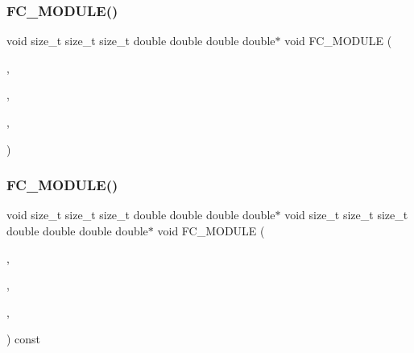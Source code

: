 \hypertarget{SimpleKernels_8H_aab57e6641df726e7d4d0795fdb8d2952}{}\label{SimpleKernels_8H_aab57e6641df726e7d4d0795fdb8d2952} 
\subsubsection{\texorpdfstring{F\+C\+\_\+\+M\+O\+D\+U\+L\+E()}{FC\_MODULE()}\hspace{0.1cm}{\footnotesize\ttfamily [17/26]}}
{\footnotesize\ttfamily void size\+\_\+t size\+\_\+t size\+\_\+t double double double double$\ast$ void F\+C\+\_\+\+M\+O\+D\+U\+LE (\begin{DoxyParamCaption}\item[{simple}]{,  }\item[{zwmxpy}]{,  }\item[{S\+I\+M\+P\+LE}]{,  }\item[{Z\+M\+W\+X\+PY}]{ }\end{DoxyParamCaption})}

\hypertarget{SimpleKernels_8H_a915edc4c95b0163b19b9ec4becea388c}{}\label{SimpleKernels_8H_a915edc4c95b0163b19b9ec4becea388c} 
\subsubsection{\texorpdfstring{F\+C\+\_\+\+M\+O\+D\+U\+L\+E()}{FC\_MODULE()}\hspace{0.1cm}{\footnotesize\ttfamily [18/26]}}
{\footnotesize\ttfamily void size\+\_\+t size\+\_\+t size\+\_\+t double double double double$\ast$ void size\+\_\+t size\+\_\+t size\+\_\+t double double double double$\ast$ void F\+C\+\_\+\+M\+O\+D\+U\+LE (\begin{DoxyParamCaption}\item[{simple}]{,  }\item[{assignmentyx}]{,  }\item[{S\+I\+M\+P\+LE}]{,  }\item[{A\+S\+S\+I\+G\+N\+M\+E\+N\+T\+YX}]{ }\end{DoxyParamCaption}) const}

\hypertarget{SimpleKernels_8H_a3e326b2ac2126aa38be4c6e364780b38}{}\label{SimpleKernels_8H_a3e326b2ac2126aa38be4c6e364780b38} 
